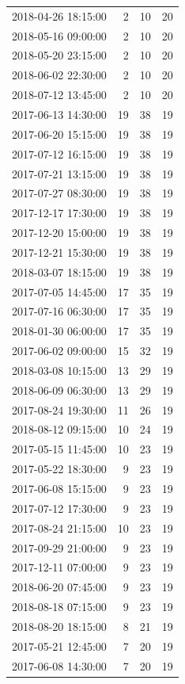 \begin{tabular}{lrrr}
2018-04-26 18:15:00 & 2 & 10 & 20 \\
2018-05-16 09:00:00 & 2 & 10 & 20 \\
2018-05-20 23:15:00 & 2 & 10 & 20 \\
2018-06-02 22:30:00 & 2 & 10 & 20 \\
2018-07-12 13:45:00 & 2 & 10 & 20 \\
2017-06-13 14:30:00 & 19 & 38 & 19 \\
2017-06-20 15:15:00 & 19 & 38 & 19 \\
2017-07-12 16:15:00 & 19 & 38 & 19 \\
2017-07-21 13:15:00 & 19 & 38 & 19 \\
2017-07-27 08:30:00 & 19 & 38 & 19 \\
2017-12-17 17:30:00 & 19 & 38 & 19 \\
2017-12-20 15:00:00 & 19 & 38 & 19 \\
2017-12-21 15:30:00 & 19 & 38 & 19 \\
2018-03-07 18:15:00 & 19 & 38 & 19 \\
2017-07-05 14:45:00 & 17 & 35 & 19 \\
2017-07-16 06:30:00 & 17 & 35 & 19 \\
2018-01-30 06:00:00 & 17 & 35 & 19 \\
2017-06-02 09:00:00 & 15 & 32 & 19 \\
2018-03-08 10:15:00 & 13 & 29 & 19 \\
2018-06-09 06:30:00 & 13 & 29 & 19 \\
2017-08-24 19:30:00 & 11 & 26 & 19 \\
2018-08-12 09:15:00 & 10 & 24 & 19 \\
2017-05-15 11:45:00 & 10 & 23 & 19 \\
2017-05-22 18:30:00 & 9 & 23 & 19 \\
2017-06-08 15:15:00 & 9 & 23 & 19 \\
2017-07-12 17:30:00 & 9 & 23 & 19 \\
2017-08-24 21:15:00 & 10 & 23 & 19 \\
2017-09-29 21:00:00 & 9 & 23 & 19 \\
2017-12-11 07:00:00 & 9 & 23 & 19 \\
2018-06-20 07:45:00 & 9 & 23 & 19 \\
2018-08-18 07:15:00 & 9 & 23 & 19 \\
2018-08-20 18:15:00 & 8 & 21 & 19 \\
2017-05-21 12:45:00 & 7 & 20 & 19 \\
2017-06-08 14:30:00 & 7 & 20 & 19 \\

\end{tabular}
